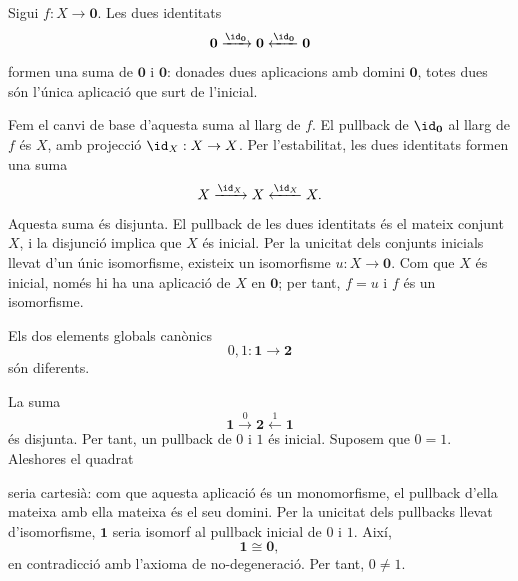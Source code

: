 \begin{prova}
Sigui \(f:X\to\mathbf0\). Les dues identitats
\[
\mathbf0\xrightarrow{\id_{\mathbf0}}\mathbf0
\xleftarrow{\id_{\mathbf0}}\mathbf0
\]
formen una suma de \(\mathbf0\) i \(\mathbf0\): donades dues
aplicacions amb domini \(\mathbf0\), totes dues són l'única aplicació
que surt de l'inicial.

Fem el canvi de base d'aquesta suma al llarg de \(f\). El pullback de
\(\id_{\mathbf0}\) al llarg de \(f\) és \(X\), amb projecció
\(\id_X:X\to X\). Per l'estabilitat, les dues identitats formen una
suma
\[
X\xrightarrow{\id_X}X\xleftarrow{\id_X}X.
\]
Aquesta suma és disjunta. El pullback de les dues identitats és el
mateix conjunt \(X\), i la disjunció implica que \(X\) és inicial.
Per la unicitat dels conjunts inicials llevat d'un únic isomorfisme, existeix un isomorfisme \(u:X\to\mathbf0\). Com que \(X\) és inicial, només hi ha una aplicació de \(X\) en \(\mathbf0\); per tant, \(f=u\) i \(f\) és un isomorfisme.
\end{prova}

\begin{teorema}\label{teo:zero-diferent-u}
Els dos elements globals canònics
\[
0,1:\mathbf1\to\mathbf2
\]
són diferents.
\end{teorema}

\begin{prova}
La suma
\[
\mathbf1\xrightarrow{0}\mathbf2\xleftarrow{1}\mathbf1
\]
és disjunta. Per tant, un pullback de \(0\) i \(1\) és inicial.
Suposem que \(0=1\). Aleshores el quadrat
\begin{center}
\end{center}
seria cartesià: com que aquesta aplicació és un monomorfisme, el
pullback d'ella mateixa amb ella mateixa és el seu domini. Per la unicitat dels
pullbacks llevat d'isomorfisme, \(\mathbf1\) seria isomorf al pullback
inicial de \(0\) i \(1\). Així,
\[
\mathbf1\cong\mathbf0,
\]
en contradicció amb l'axioma de no-degeneració. Per tant,
\(0\neq1\).
\end{prova}

